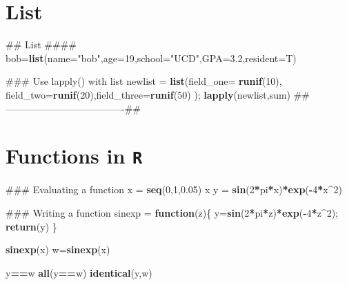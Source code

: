 \documentclass[12pt,]{book}
\newenvironment{Shaded}{\begin{snugshade}}{\end{snugshade}}
\newcommand{\KeywordTok}[1]{\textcolor[rgb]{0.13,0.29,0.53}{\textbf{#1}}}
\newcommand{\DataTypeTok}[1]{\textcolor[rgb]{0.13,0.29,0.53}{#1}}
\newcommand{\DecValTok}[1]{\textcolor[rgb]{0.00,0.00,0.81}{#1}}
\newcommand{\FloatTok}[1]{\textcolor[rgb]{0.00,0.00,0.81}{#1}}
\newcommand{\StringTok}[1]{\textcolor[rgb]{0.31,0.60,0.02}{#1}}
\newcommand{\ControlFlowTok}[1]{\textcolor[rgb]{0.13,0.29,0.53}{\textbf{#1}}}
\newcommand{\OperatorTok}[1]{\textcolor[rgb]{0.81,0.36,0.00}{\textbf{#1}}}
\newcommand{\NormalTok}[1]{#1}
\begin{document}
\section{List}\label{list}

\begin{Shaded}
\begin{Highlighting}[]
\NormalTok{## List ####}
\NormalTok{bob=}\KeywordTok{list}\NormalTok{(}\DataTypeTok{name=}\StringTok{"bob"}\NormalTok{,}\DataTypeTok{age=}\DecValTok{19}\NormalTok{,}\DataTypeTok{school=}\StringTok{"UCD"}\NormalTok{,}\DataTypeTok{GPA=}\FloatTok{3.2}\NormalTok{,}\DataTypeTok{resident=}\NormalTok{T)}

\NormalTok{### Use lapply() with list}
\NormalTok{newlist =}\StringTok{ }\KeywordTok{list}\NormalTok{(}\DataTypeTok{field_one=} \KeywordTok{runif}\NormalTok{(}\DecValTok{10}\NormalTok{), }\DataTypeTok{field_two=}\KeywordTok{runif}\NormalTok{(}\DecValTok{20}\NormalTok{),}\DataTypeTok{field_three=}\KeywordTok{runif}\NormalTok{(}\DecValTok{50}\NormalTok{) );}
\KeywordTok{lapply}\NormalTok{(newlist,sum)}
\NormalTok{##-------------------------------------##}
\end{Highlighting}
\end{Shaded}

\section{\texorpdfstring{Functions in
\texttt{R}}{Functions in R}}\label{functions-in-r}

\begin{Shaded}
\begin{Highlighting}[]
\NormalTok{### Evaluating a function}
\NormalTok{x =}\StringTok{ }\KeywordTok{seq}\NormalTok{(}\DecValTok{0}\NormalTok{,}\DecValTok{1}\NormalTok{,}\FloatTok{0.05}\NormalTok{)}
\NormalTok{x}
\NormalTok{y =}\StringTok{ }\KeywordTok{sin}\NormalTok{(}\DecValTok{2}\OperatorTok{*}\NormalTok{pi}\OperatorTok{*}\NormalTok{x)}\OperatorTok{*}\KeywordTok{exp}\NormalTok{(}\OperatorTok{-}\DecValTok{4}\OperatorTok{*}\NormalTok{x}\OperatorTok{^}\DecValTok{2}\NormalTok{)}

\NormalTok{### Writing a function}
\NormalTok{sinexp =}\StringTok{ }\ControlFlowTok{function}\NormalTok{(z)\{}
\NormalTok{  y=}\KeywordTok{sin}\NormalTok{(}\DecValTok{2}\OperatorTok{*}\NormalTok{pi}\OperatorTok{*}\NormalTok{z)}\OperatorTok{*}\KeywordTok{exp}\NormalTok{(}\OperatorTok{-}\DecValTok{4}\OperatorTok{*}\NormalTok{z}\OperatorTok{^}\DecValTok{2}\NormalTok{);}
  \KeywordTok{return}\NormalTok{(y)}
\NormalTok{\}}

\KeywordTok{sinexp}\NormalTok{(x)}
\NormalTok{w=}\KeywordTok{sinexp}\NormalTok{(x)}

\NormalTok{y}\OperatorTok{==}\NormalTok{w}
\KeywordTok{all}\NormalTok{(y}\OperatorTok{==}\NormalTok{w)}
\KeywordTok{identical}\NormalTok{(y,w)}
\end{Highlighting}
\end{Shaded}
\end{document}
